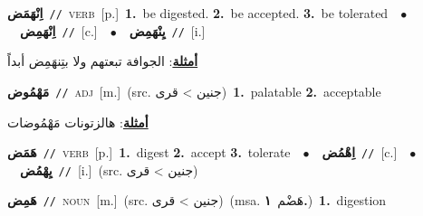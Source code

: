 \documentclass[10pt,a4paper,twoside]{article} %
\begin{document}
\begin{multicols}{2}
{\setlength\topsep{0pt}\textbf{\foreignlanguage{arabic}{اِنْهَمَض}}\ {\color{gray}\texttt{//}\color{black}}\ \textsc{verb}\ [p.]\ \textbf{1.}~be digested.  \textbf{2.}~be accepted.  \textbf{3.}~be tolerated\ \ $\bullet$\ \ \setlength\topsep{0pt}\textbf{\foreignlanguage{arabic}{اِنْهَمِض}}\ {\color{gray}\texttt{//}\color{black}}\ [c.]\ \ $\bullet$\ \ \setlength\topsep{0pt}\textbf{\foreignlanguage{arabic}{يِنْهَمِض}}\ {\color{gray}\texttt{//}\color{black}}\ [i.]\  \begin{flushright}\color{gray}\foreignlanguage{arabic}{\textbf{\underline{\foreignlanguage{arabic}{أمثلة}}}: الجوافة تبعتهم ولا بتِنهَمِض أبداً}\end{flushright}\color{black}} \vspace{2mm}

{\setlength\topsep{0pt}\textbf{\foreignlanguage{arabic}{مَهْمُوض}}\ {\color{gray}\texttt{//}\color{black}}\ \textsc{adj}\ [m.]\ (src. \color{gray}\foreignlanguage{arabic}{جنين > قرى}\color{black})\ \textbf{1.}~palatable  \textbf{2.}~acceptable\  \begin{flushright}\color{gray}\foreignlanguage{arabic}{\textbf{\underline{\foreignlanguage{arabic}{أمثلة}}}: هالزتونات مَهْمُوضات}\end{flushright}\color{black}} \vspace{2mm}

{\setlength\topsep{0pt}\textbf{\foreignlanguage{arabic}{هَمَض}}\ {\color{gray}\texttt{//}\color{black}}\ \textsc{verb}\ [p.]\ \textbf{1.}~digest  \textbf{2.}~accept  \textbf{3.}~tolerate\ \ $\bullet$\ \ \setlength\topsep{0pt}\textbf{\foreignlanguage{arabic}{اِهْمُض}}\ {\color{gray}\texttt{//}\color{black}}\ [c.]\ \ $\bullet$\ \ \setlength\topsep{0pt}\textbf{\foreignlanguage{arabic}{يِهْمُض}}\ {\color{gray}\texttt{//}\color{black}}\ [i.]\ (src. \color{gray}\foreignlanguage{arabic}{جنين > قرى}\color{black})\ } \vspace{2mm}

{\setlength\topsep{0pt}\textbf{\foreignlanguage{arabic}{هَمِض}}\ {\color{gray}\texttt{//}\color{black}}\ \textsc{noun}\ [m.]\ (src. \color{gray}\foreignlanguage{arabic}{جنين > قرى}\color{black})\ \color{gray}(msa. \foreignlanguage{arabic}{هَضْم}~\foreignlanguage{arabic}{\textbf{١.}})\color{black}\ \textbf{1.}~digestion\ } \vspace{2mm}


\end{multicols}
\end{document}
